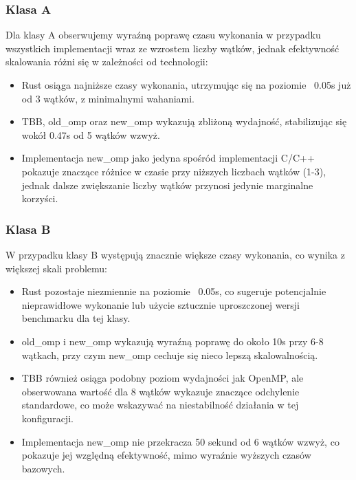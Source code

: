 \subsubsection{Klasa A}
Dla klasy A obserwujemy wyraźną poprawę czasu wykonania w przypadku wszystkich implementacji wraz ze wzrostem liczby wątków, jednak efektywność skalowania różni się w zależności od technologii:
\begin{itemize}
    \item Rust osiąga najniższe czasy wykonania, utrzymując się na poziomie ~0.05s już od 3 wątków, z minimalnymi wahaniami.
    \item TBB, old\_omp oraz new\_omp wykazują zbliżoną wydajność, stabilizując się wokół 0.47s od 5 wątków wzwyż.
    \item Implementacja new\_omp jako jedyna spośród implementacji C/C++ pokazuje znaczące różnice w czasie przy niższych liczbach wątków (1-3), jednak dalsze zwiększanie liczby wątków przynosi jedynie marginalne korzyści.
\end{itemize}

\subsubsection{Klasa B}
W przypadku klasy B występują znacznie większe czasy wykonania, co wynika z większej skali problemu:
\begin{itemize}
    \item Rust pozostaje niezmiennie na poziomie ~0.05s, co sugeruje potencjalnie nieprawidłowe wykonanie lub użycie sztucznie uproszczonej wersji benchmarku dla tej klasy.
    \item old\_omp i new\_omp wykazują wyraźną poprawę do około 10s przy 6-8 wątkach, przy czym new\_omp cechuje się nieco lepszą skalowalnością.
    \item TBB również osiąga podobny poziom wydajności jak OpenMP, ale obserwowana wartość dla 8 wątków wykazuje znaczące odchylenie standardowe, co może wskazywać na niestabilność działania w tej konfiguracji.
    \item Implementacja new\_omp nie przekracza 50 sekund od 6 wątków wzwyż, co pokazuje jej względną efektywność, mimo wyraźnie wyższych czasów bazowych.
\end{itemize}


